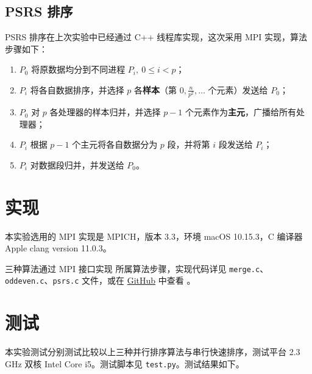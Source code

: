 \documentclass{zjureport-zh}
\begin{document}
\subsection{PSRS 排序}
\par PSRS 排序在上次实验中已经通过 C++ 线程库实现，这次采用 MPI 实现，算法步骤如下：
\begin{enumerate}[itemindent=2em,label=\roman*)]
	\item $P_0$ 将原数据均分到不同进程 $P_i,\ 0 \leq i < p$；
	\item $P_i$ 将各自数据排序，并选择 $p$ 各\textbf{样本}（第 $0, \frac{n}{p^2}, \dots$ 个元素）发送给 $P_0$；
	\item $P_0$ 对 $p$ 各处理器的样本归并，并选择 $p-1$ 个元素作为\textbf{主元}，广播给所有处理器；
	\item $P_i$ 根据 $p-1$ 个主元将各自数据分为 $p$ 段，并将第 $i$ 段发送给 $P_i$；
	\item $P_i$ 对数据段归并，并发送给 $P_0$。
\end{enumerate}


\section{实现}
\par 本实验选用的 MPI 实现是 MPICH，版本 3.3，环境 macOS 10.15.3，C 编译器 Apple clang version 11.0.3。
\par 三种算法通过 MPI 接口实现 所属算法步骤，实现代码详见 \texttt{merge.c}、\texttt{oddeven.c}、\texttt{psrs.c} 文件，或在 \href{https://github.com/34z/mpi-sort}{GitHub} 中查看 。


\section{测试}
\par 本实验测试分别测试比较以上三种并行排序算法与串行快速排序，测试平台 2.3 GHz 双核 Intel Core i5。测试脚本见 \texttt{test.py}。测试结果如下。
\end{document}
